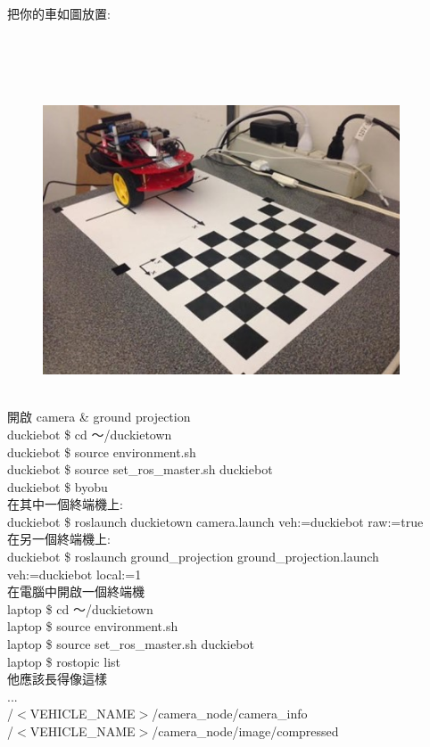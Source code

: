 \documentclass{article}
\begin{document}
把你的車如圖放置:
\\\\\\\\\\
\begin{figure}[htp]
    \begin{center}
        \includegraphics[width=300pt]{pic/圖片16.jpg}
    \end{center}
\end{figure}
\\
開啟 camera \& ground projection
\\duckiebot \$ cd ～/duckietown
\\duckiebot \$ source environment.sh
\\duckiebot \$ source set\_ros\_master.sh duckiebot
\\duckiebot \$ byobu
\\在其中一個終端機上:
\\duckiebot \$ roslaunch duckietown camera.launch veh:=duckiebot raw:=true
\\在另一個終端機上:
\\duckiebot \$ roslaunch ground\_projection ground\_projection.launch  veh:=duckiebot local:=1
\\在電腦中開啟一個終端機
\\laptop \$ cd ～/duckietown
\\laptop \$ source environment.sh
\\laptop \$ source set\_ros\_master.sh duckiebot
\\laptop \$ rostopic list
\\他應該長得像這樣
\\...
\\/$<$VEHICLE\_NAME$>$/camera\_node/camera\_info
\\/$<$VEHICLE\_NAME$>$/camera\_node/image/compressed
\end{document}
